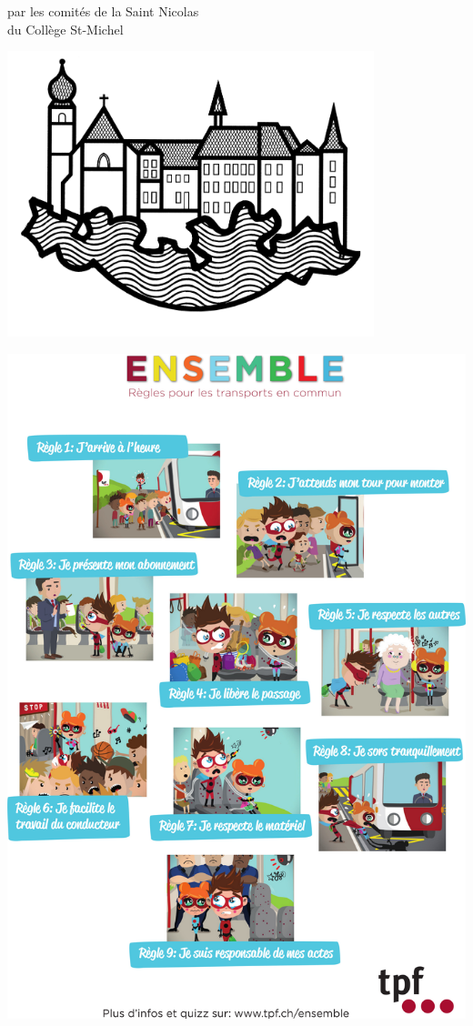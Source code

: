 \begin{center}
{\Huge par les comités de la Saint Nicolas\vspace*{1mm}\\
du Collège St-Michel}
\vspace*{5mm}
\par
\includegraphics[width=0.8\textwidth]{fig/csm.jpg}
\end{center}


\clearpage
\thispagestyle{empty}%
{\centering
\includegraphics[width=.9\textwidth]{fig/ensemble.jpg}
\par
}
\clearpage
